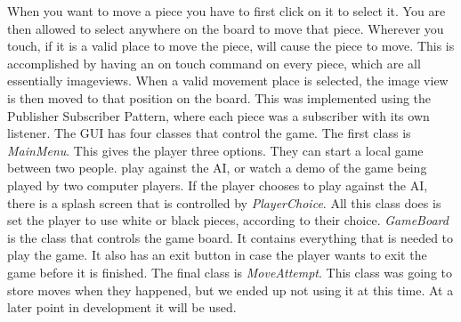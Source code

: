\documentclass{article}
\begin{document}
	When you want to move a piece you have to first click on it to select it. You are then allowed to select anywhere on the board to move that piece. Wherever you touch, if it is a valid place to move the piece, will cause the piece to move. This is accomplished by having an on touch command on every piece, which are all essentially imageviews. When a valid movement place is selected, the image view is then moved to that position on the board. This was implemented using the Publisher Subscriber Pattern, where each piece was a subscriber with its own listener. 
	The GUI has four classes that control the game. The first class is \textit{MainMenu}. This gives the player three options. They can start a local game between two people. play against the AI, or watch a demo of the game being played by two computer players. If the player chooses to play against the AI, there is a splash screen that is controlled by \textit{PlayerChoice}. All this class does is set the player to use white or black pieces, according to their choice. \textit{GameBoard} is the class that controls the game board. It contains everything that is needed to play the game. It also has an exit button in case the player wants to exit the game before it is finished. The final class is \textit{MoveAttempt}. This class was going to store moves when they happened, but we ended up not using it at this time. At a later point in development it will be used. 
\end{document}
